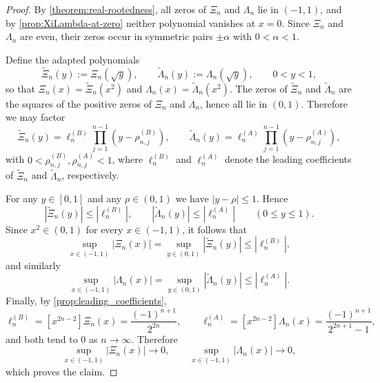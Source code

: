 \documentclass[11pt,twoside]{article}
\numberwithin{equation}{section}
\begin{document}
\begin{proof}
By \cref{theorem:real-rootedness}, all zeros of $\Xi_n$ and $\Lambda_n$ lie in
$(-1,1)$, and by \cref{prop:XiLambda-at-zero} neither polynomial vanishes at
$x=0$. Since $\Xi_n$ and $\Lambda_n$ are even, their zeros occur in symmetric
pairs $\pm\alpha$ with $0<\alpha<1$.

Define the adapted polynomials
\[
\widetilde{\Xi}_n(y):=\Xi_n(\sqrt y),
\qquad
\widetilde{\Lambda}_n(y):=\Lambda_n(\sqrt y),
\qquad 0<y<1,
\]
so that $\Xi_n(x)=\widetilde{\Xi}_n(x^2)$ and
$\Lambda_n(x)=\widetilde{\Lambda}_n(x^2)$. The zeros of
$\widetilde{\Xi}_n$ and $\widetilde{\Lambda}_n$ are the squares of the positive
zeros of $\Xi_n$ and $\Lambda_n$, hence all lie in $(0,1)$. Therefore we may
factor
\[
\widetilde{\Xi}_n(y)=\ell^{(B)}_n\prod_{j=1}^{n-1}(y-\rho^{(B)}_{n,j}),
\qquad
\widetilde{\Lambda}_n(y)=\ell^{(A)}_n\prod_{j=1}^{n-1}(y-\rho^{(A)}_{n,j}),
\]
with $0<\rho^{(B)}_{n,j},\rho^{(A)}_{n,j}<1$, where $\ell^{(B)}_n$ and
$\ell^{(A)}_n$ denote the leading coefficients of $\widetilde{\Xi}_n$ and
$\widetilde{\Lambda}_n$, respectively.

For any $y\in[0,1]$ and any $\rho\in(0,1)$ we have $|y-\rho|\le1$. Hence
\[
|\widetilde{\Xi}_n(y)|\le |\ell^{(B)}_n|,
\qquad
|\widetilde{\Lambda}_n(y)|\le |\ell^{(A)}_n|
\qquad (0\le y\le 1).
\]
Since $x^2\in(0,1)$ for every $x\in(-1,1)$, it follows that
\[
\sup_{x\in(-1,1)}|\Xi_n(x)|
=
\sup_{y\in(0,1)}|\widetilde{\Xi}_n(y)|
\le
|\ell^{(B)}_n|,
\]
and similarly
\[
\sup_{x\in(-1,1)}|\Lambda_n(x)|
=
\sup_{y\in(0,1)}|\widetilde{\Lambda}_n(y)|
\le
|\ell^{(A)}_n|.
\]
Finally, by \cref{prop:leading_coefficients},
\[
\ell^{(B)}_n=[x^{2n-2}]\Xi_n(x)=\frac{(-1)^{n+1}}{2^{2n}},
\qquad
\ell^{(A)}_n=[x^{2n-2}]\Lambda_n(x)=\frac{(-1)^{n+1}}{2^{2n+1}-1},
\]
and both tend to $0$ as $n\to\infty$. Therefore
\[
\sup_{x\in(-1,1)}|\Xi_n(x)|\to0,
\qquad
\sup_{x\in(-1,1)}|\Lambda_n(x)|\to0,
\]
which proves the claim.
\end{proof}
\end{document}
